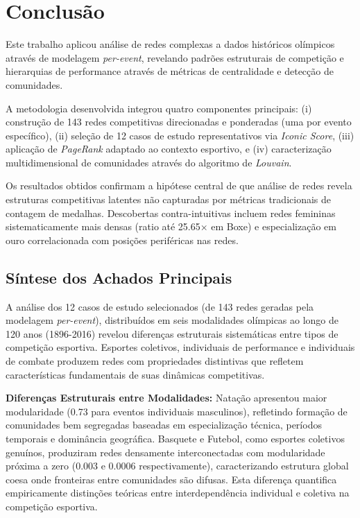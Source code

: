 \chapter[Conclusão]{Conclusão}

Este trabalho aplicou análise de redes complexas a dados históricos olímpicos através de modelagem \textit{per-event}, revelando padrões estruturais de competição e hierarquias de performance através de métricas de centralidade e detecção de comunidades.

A metodologia desenvolvida integrou quatro componentes principais: (i) construção de 143 redes competitivas direcionadas e ponderadas (uma por evento específico), (ii) seleção de 12 casos de estudo representativos via \textit{Iconic Score}{}, (iii) aplicação de \textit{PageRank}{} adaptado ao contexto esportivo, e (iv) caracterização multidimensional de comunidades através do algoritmo de \textit{Louvain}{}.

Os resultados obtidos confirmam a hipótese central de que análise de redes revela estruturas competitivas latentes não capturadas por métricas tradicionais de contagem de medalhas. Descobertas contra-intuitivas incluem redes femininas sistematicamente mais densas (ratio até 25.65× em Boxe) e especialização em ouro correlacionada com posições periféricas nas redes.

\section{Síntese dos Achados Principais}

A análise dos 12 casos de estudo selecionados (de 143 redes geradas pela modelagem \textit{per-event}), distribuídos em seis modalidades olímpicas ao longo de 120 anos (1896-2016) revelou diferenças estruturais sistemáticas entre tipos de competição esportiva. Esportes coletivos, individuais de performance e individuais de combate produzem redes com propriedades distintivas que refletem características fundamentais de suas dinâmicas competitivas.

\textbf{Diferenças Estruturais entre Modalidades:} Natação apresentou maior modularidade (0.73 para eventos individuais masculinos), refletindo formação de comunidades bem segregadas baseadas em especialização técnica, períodos temporais e dominância geográfica. Basquete e Futebol, como esportes coletivos genuínos, produziram redes densamente interconectadas com modularidade próxima a zero (0.003 e 0.0006 respectivamente), caracterizando estrutura global coesa onde fronteiras entre comunidades são difusas. Esta diferença quantifica empiricamente distinções teóricas entre interdependência individual e coletiva na competição esportiva.

